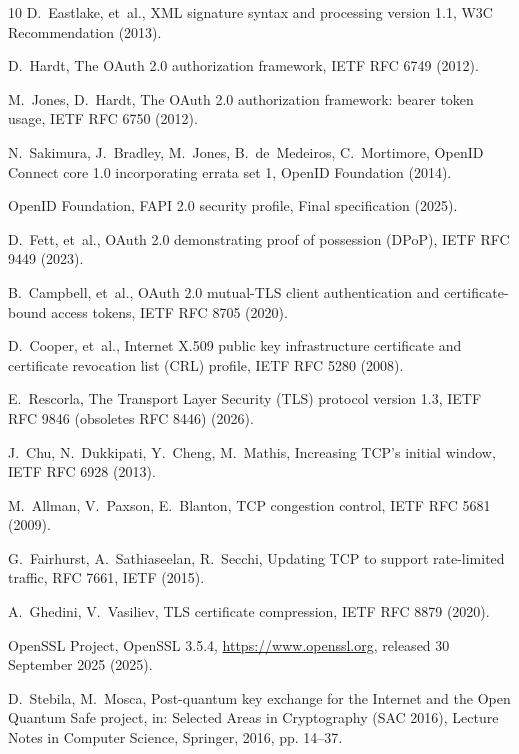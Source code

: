 \documentclass[preprint,12pt]{elsarticle}
\begin{document}
\begin{thebibliography}{10}
D.~Eastlake, et~al., {XML} signature syntax and processing version 1.1, W3C
  Recommendation (2013).

D.~Hardt, The {OAuth} 2.0 authorization framework, {IETF} RFC 6749 (2012).

M.~Jones, D.~Hardt, The {OAuth} 2.0 authorization framework: bearer token
  usage, {IETF} RFC 6750 (2012).

N.~Sakimura, J.~Bradley, M.~Jones, B.~de~Medeiros, C.~Mortimore, {OpenID
  Connect} core 1.0 incorporating errata set 1, OpenID Foundation (2014).

{OpenID Foundation}, {FAPI} 2.0 security profile, Final specification (2025).

D.~Fett, et~al., {OAuth} 2.0 demonstrating proof of possession ({DPoP}), {IETF}
  RFC 9449 (2023).

B.~Campbell, et~al., {OAuth} 2.0 mutual-{TLS} client authentication and
  certificate-bound access tokens, {IETF} RFC 8705 (2020).

D.~Cooper, et~al., Internet {X.509} public key infrastructure certificate and
  certificate revocation list ({CRL}) profile, {IETF} RFC 5280 (2008).

E.~Rescorla, The {Transport Layer Security} ({TLS}) protocol version 1.3,
  {IETF} RFC 9846 (obsoletes RFC 8446) (2026).

J.~Chu, N.~Dukkipati, Y.~Cheng, M.~Mathis, Increasing {TCP}'s initial window,
  {IETF} RFC 6928 (2013).

M.~Allman, V.~Paxson, E.~Blanton, {TCP} congestion control, {IETF} RFC 5681
  (2009).

G.~Fairhurst, A.~Sathiaseelan, R.~Secchi, Updating {TCP} to support
  rate-limited traffic, RFC 7661, IETF (2015).

A.~Ghedini, V.~Vasiliev, {TLS} certificate compression, {IETF} RFC 8879 (2020).

{OpenSSL Project}, {OpenSSL} 3.5.4, \url{https://www.openssl.org}, released 30
  September 2025 (2025).

D.~Stebila, M.~Mosca, Post-quantum key exchange for the {Internet} and the
  {Open Quantum Safe} project, in: Selected Areas in Cryptography (SAC 2016),
  Lecture Notes in Computer Science, Springer, 2016, pp. 14--37.


\end{thebibliography}
\end{document}
